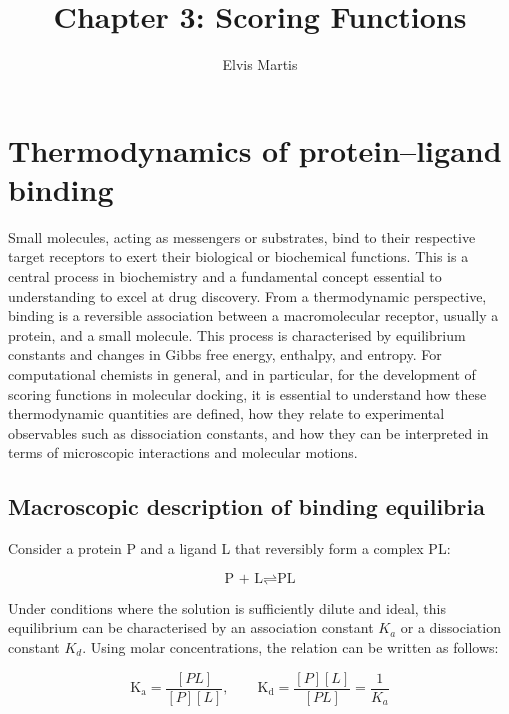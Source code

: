 \documentclass[12pt]{article}
\begin{document}
\title{Chapter 3: Scoring Functions}
\author{Elvis Martis}
\date{}
\maketitle


\section{Thermodynamics of protein--ligand binding}

Small molecules, acting as messengers or substrates, bind to their respective target receptors to exert their biological or biochemical functions. This is a central process in biochemistry and a fundamental concept essential to understanding to excel at drug discovery. From a thermodynamic perspective, binding is a reversible association between a macromolecular receptor, usually a protein, and a small molecule. This process is characterised by equilibrium constants and changes in Gibbs free energy, enthalpy, and entropy\cite{CH3_DillBromberg,CH3_AtkinsDePaula}. For computational chemists in general, and in particular, for the development of scoring functions in molecular docking, it is essential to understand how these thermodynamic quantities are defined, how they relate to experimental observables such as dissociation constants, and how they can be interpreted in terms of microscopic interactions and molecular motions\cite{CH3_GilsonZhou2007}.

\subsection{Macroscopic description of binding equilibria}

Consider a protein P and a ligand L that reversibly form a complex PL:

\begin{equation}
    \textrm{P + L} \rightleftharpoons \textrm{PL}
\label{eq:PL_compl}
\end{equation}

Under conditions where the solution is sufficiently dilute and ideal, this equilibrium can be characterised by an association constant $K_a$ or a dissociation constant $K_d$. Using molar concentrations, the relation can be written as follows:

\begin{equation}
        \textrm{K}_\textrm{a} = \frac{[PL]}{[P][L]}, \qquad \textrm{K}_\textrm{d} = \frac{[P][L]}{[PL]} = \frac{1}{K_a}
\label{eq:molar_binding}
\end{equation}
\end{document}
